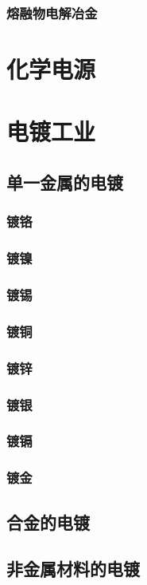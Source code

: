 \documentclass[UTF8]{../03-Chemistry}
\begin{document}
    \subsubsection{熔融物电解冶金}

\section{化学电源}

\section{电镀工业}
    \subsection{单一金属的电镀}
        \subsubsection{镀铬}
        \subsubsection{镀镍}
        \subsubsection{镀锡}
        \subsubsection{镀铜}
        \subsubsection{镀锌}
        \subsubsection{镀银}
        \subsubsection{镀镉}
        \subsubsection{镀金}
    \subsection{合金的电镀}
    \subsection{非金属材料的电镀}
\end{document}
